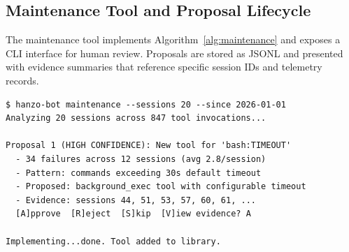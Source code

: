 \subsection{Maintenance Tool and Proposal Lifecycle}

The maintenance tool implements Algorithm~\ref{alg:maintenance} and exposes
a CLI interface for human review. Proposals are stored as JSONL and presented
with evidence summaries that reference specific session IDs and telemetry records.

\begin{verbatim}
$ hanzo-bot maintenance --sessions 20 --since 2026-01-01
Analyzing 20 sessions across 847 tool invocations...

Proposal 1 (HIGH CONFIDENCE): New tool for 'bash:TIMEOUT'
  - 34 failures across 12 sessions (avg 2.8/session)
  - Pattern: commands exceeding 30s default timeout
  - Proposed: background_exec tool with configurable timeout
  - Evidence: sessions 44, 51, 53, 57, 60, 61, ...
  [A]pprove  [R]eject  [S]kip  [V]iew evidence? A

Implementing...done. Tool added to library.
\end{verbatim}

